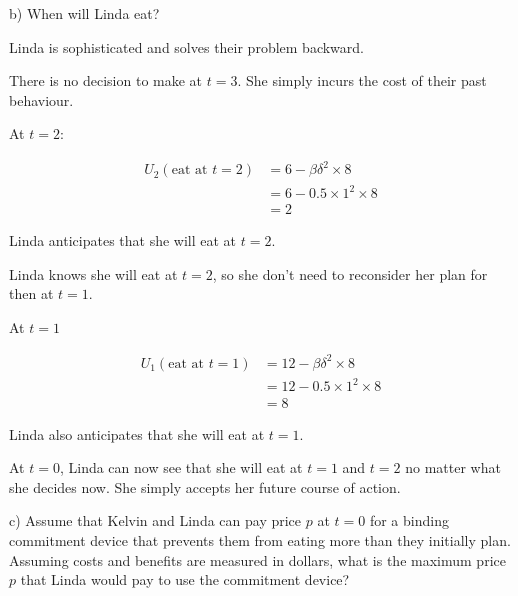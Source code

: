 \documentclass[
  letterpaper,
  DIV=11,
  numbers=noendperiod]{scrreprt}
\begin{document}
b) When will Linda eat?

\begin{tcolorbox}[enhanced jigsaw, title=\textcolor{quarto-callout-tip-color}{\faLightbulb}\hspace{0.5em}{Answer}, toprule=.15mm, colback=white, breakable, titlerule=0mm, colframe=quarto-callout-tip-color-frame, coltitle=black, opacityback=0, rightrule=.15mm, colbacktitle=quarto-callout-tip-color!10!white, bottomtitle=1mm, opacitybacktitle=0.6, arc=.35mm, bottomrule=.15mm, toptitle=1mm, leftrule=.75mm, left=2mm]

Linda is sophisticated and solves their problem backward.

There is no decision to make at \(t=3\). She simply incurs the cost of
their past behaviour.

At \(t=2\):

\begin{align*}
U_2(\text{eat at } t=2)&=6-\beta\delta^2\times 8 \\
&=6-0.5\times 1^2 \times 8 \\
&=2
\end{align*}

Linda anticipates that she will eat at \(t=2\).

Linda knows she will eat at \(t=2\), so she don't need to reconsider her
plan for then at \(t=1\).

At \(t=1\)

\begin{align*}
U_1(\text{eat at } t=1)&=12-\beta\delta^2\times 8 \\
&=12-0.5\times 1^2 \times 8 \\
&=8
\end{align*}

Linda also anticipates that she will eat at \(t=1\).

At \(t=0\), Linda can now see that she will eat at \(t=1\) and \(t=2\)
no matter what she decides now. She simply accepts her future course of
action.

\end{tcolorbox}

c) Assume that Kelvin and Linda can pay price \(p\) at \(t=0\) for a
binding commitment device that prevents them from eating more than they
initially plan. Assuming costs and benefits are measured in dollars,
what is the maximum price \(p\) that Linda would pay to use the
commitment device?
\end{document}
